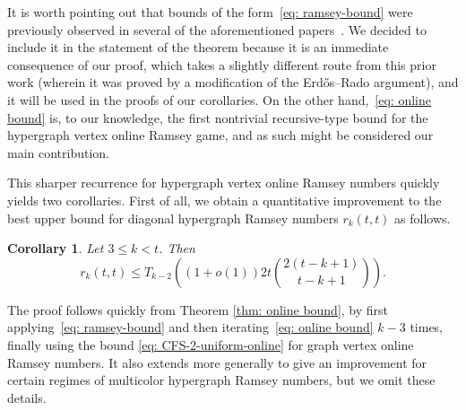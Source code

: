 \documentclass[A4paper,reqno,oneside,12pt]{amsart}
\theoremstyle{plain}
\newtheorem{corollary}[theorem]{Corollary}
\theoremstyle{definition}
\begin{document}
It is worth pointing out that bounds of the form~\eqref{eq: ramsey-bound} were previously observed in several of the aforementioned papers~\cite{CFS10, FPSS12, GPS}.
We decided to include it in the statement of the theorem because it is an immediate consequence of our proof, which takes a slightly different route from this prior work (wherein it was proved by a modification of the Erd\H{o}s--Rado argument), and it will be used in the proofs of our corollaries.
On the other hand,~\eqref{eq: online bound} is, to our knowledge, the first nontrivial recursive-type bound for the hypergraph vertex online Ramsey game, and as such might be considered our main contribution.

This sharper recurrence for hypergraph vertex online Ramsey numbers quickly yields two corollaries.
First of all, we obtain a quantitative improvement to the best upper bound for diagonal hypergraph Ramsey numbers $r_k(t,t)$ as follows.

\begin{corollary}
\label{cor: quantitative-bound}
    Let $3 \leq k < t$. Then
    \begin{equation*}
        r_k(t,t)\leq T_{k-2}\left((1+o(1))2t\binom{2(t-k+1)}{t-k+1}\right).
    \end{equation*}
\end{corollary}

The proof follows quickly from Theorem \ref{thm: online bound}, by first applying~\eqref{eq: ramsey-bound} and then iterating~\eqref{eq: online bound} $k-3$ times, finally using the bound \eqref{eq: CFS-2-uniform-online} for graph vertex online Ramsey numbers. 
It also extends more generally to give an improvement for certain regimes of multicolor hypergraph Ramsey numbers, but we omit these details.

\end{document}
